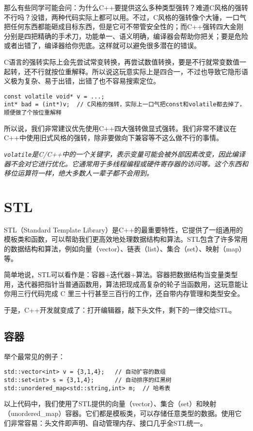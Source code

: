 \documentclass[../main.tex]{subfiles}
\begin{document}
那么有些同学可能会问：为什么C++要提供这么多种类型强转？难道C风格的强转不行吗？没错，两种代码实际上都可以用。不过，C风格的强转像个大锤，一口气把任何东西都能砸成目标东西，但是它可不带管安全性的；而C++强转四大金刚分别是四把精确的手术刀，功能单一、语义明确，编译器会帮助你把关；要是危险或者出错了，编译器给你兜底。这样就可以避免很多潜在的错误。

C语言的强转实际上会先尝试常变转换，再尝试数值转换，要是不行就常变数值一起转，还不行就按位重解释。所以说这玩意实际上是四合一，不过也导致它隐形语义极为复杂、易于出错，出错了也不容易搜索定位。

\begin{lstlisting}
const volatile void* v = ...;
int* bad = (int*)v;  // C风格的强转，实际上一口气把const和volatile都去掉了，顺便做了个按位重解释
\end{lstlisting}

所以说，我们非常建议优先使用C++四大强转做显式强转。我们非常不建议在C++中使用旧式风格的强转，除非要做向下兼容等不这么做不行的事情。

\emph{
  \texttt{volatile}是C/C++中的一个关键字，表示变量可能会被外部因素改变，因此编译器不会对它进行优化。它通常用于多线程编程或硬件寄存器的访问等。这个东西和移位运算符一样，绝大多数人一辈子都不会用到。
}

\section{STL}

STL（Standard Template Library）是C++的最重要特性，它提供了一组通用的模板类和函数，可以帮助我们更高效地处理数据结构和算法。STL包含了许多常用的数据结构和算法，例如向量（vector）、链表（list）、集合（set）、映射（map）等。

简单地说，STL可以看作是：容器+迭代器+算法。容器把数据结构当变量类型用，迭代器把指针当普通函数用，算法把现成高复杂的轮子当函数用，这玩意能让你用三行代码完成 C 里三十行甚至三百行的工作，还自带内存管理和类型安全。

于是，C++开发就变成了：打开编辑器，敲下头文件，剩下的一律交给STL。

\subsection{容器}

举个最常见的例子：
\begin{lstlisting}
std::vector<int> v = {3,1,4};   // 自动扩容的数组
std::set<int> s = {3,1,4};      // 自动排序的红黑树
std::unordered_map<std::string,int> m;  // 哈希表
\end{lstlisting}
以上代码中，我们使用了STL提供的向量（vector）、集合（set）和映射（unordered\_map）容器。它们都是模板类，可以存储任意类型的数据。使用它们非常容易：头文件即声明、自动管理内存、接口几乎全STL统一。
\end{document}
